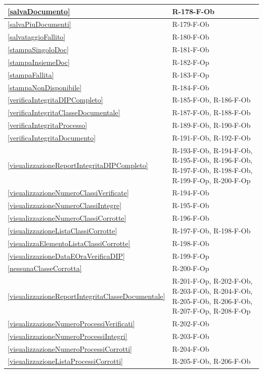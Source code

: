 \begin{longtable}{|p{4cm}|p{10cm}|}
\hline
\ref{salvaDocumento} & R-178-F-Ob \\
\hline
\ref{salvaPiuDocumenti} & R-179-F-Ob \\
\hline
\ref{salvataggioFallito} & R-180-F-Ob \\
\hline
\ref{stampaSingoloDoc} & R-181-F-Ob \\
\hline
\ref{stampaInsiemeDoc} & R-182-F-Op \\
\hline
\ref{stampaFallita} & R-183-F-Op \\
\hline
\ref{stampaNonDisponibile} & R-184-F-Ob \\
\hline
\ref{verificaIntegritaDIPCompleto} & R-185-F-Ob, R-186-F-Ob \\
\hline
\ref{verificaIntegritaClasseDocumentale} & R-187-F-Ob, R-188-F-Ob \\
\hline
\ref{verificaIntegritaProcesso} & R-189-F-Ob, R-190-F-Ob \\
\hline
\ref{verificaIntegritaDocumento} & R-191-F-Ob, R-192-F-Ob \\
\hline
\ref{visualizzazioneReportIntegritaDIPCompleto} & R-193-F-Ob, R-194-F-Ob, R-195-F-Ob, R-196-F-Ob, R-197-F-Ob, R-198-F-Ob, R-199-F-Op, R-200-F-Op \\
\hline
\ref{visualizzazioneNumeroClassiVerificate} & R-194-F-Ob \\
\hline
\ref{visualizzazioneNumeroClassiIntegre} & R-195-F-Ob \\
\hline
\ref{visualizzazioneNumeroClassiCorrotte} & R-196-F-Ob \\
\hline
\ref{visualizzazioneListaClassiCorrotte} & R-197-F-Ob, R-198-F-Ob \\
\hline
\ref{visualizzaElementoListaClassiCorrotte} & R-198-F-Ob \\
\hline
\ref{visualizzazioneDataEOraVerificaDIP} & R-199-F-Op \\
\hline
\ref{nessunaClasseCorrotta} & R-200-F-Op \\
\hline
\ref{visualizzazioneReportIntegritaClasseDocumentale} & R-201-F-Op, R-202-F-Ob, R-203-F-Ob, R-204-F-Ob, R-205-F-Ob, R-206-F-Ob, R-207-F-Op, R-208-F-Op \\
\hline
\ref{visualizzazioneNumeroProcessiVerificati} & R-202-F-Ob \\
\hline
\ref{visualizzazioneNumeroProcessiIntegri} & R-203-F-Ob \\
\hline
\ref{visualizzazioneNumeroProcessiCorrotti} & R-204-F-Ob \\
\hline
\ref{visualizzazioneListaProcessiCorrotti} & R-205-F-Ob, R-206-F-Ob \\

\end{longtable}

